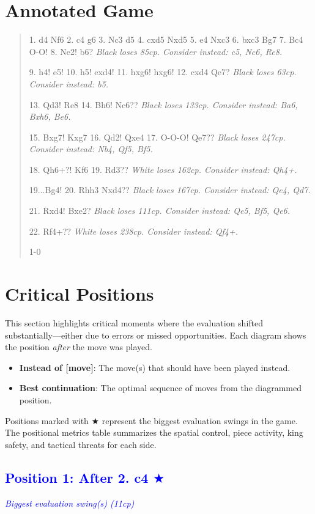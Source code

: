 \documentclass[11pt]{book}
\begin{document}
\section{Annotated Game}

\begin{quote}
1. d4 Nf6
2. c4 g6
3. Nc3 d5
4. cxd5 Nxd5
5. e4 Nxc3
6. bxc3 Bg7
7. Bc4 O-O!
8. Ne2! b6?
\textit{Black loses 85cp. Consider instead: c5, Nc6, Re8.}

9. h4! e5!
10. h5! exd4!
11. hxg6! hxg6!
12. cxd4 Qe7?
\textit{Black loses 63cp. Consider instead: b5.}

13. Qd3! Re8
14. Bh6! Nc6??
\textit{Black loses 133cp. Consider instead: Ba6, Bxh6, Be6.}

15. Bxg7! Kxg7
16. Qd2! Qxe4
17. O-O-O! Qe7??
\textit{Black loses 247cp. Consider instead: Nb4, Qf5, Bf5.}

18. Qh6+?! Kf6
19. Rd3??
\textit{White loses 162cp. Consider instead: Qh4+.}

19...Bg4!
20. Rhh3 Nxd4??
\textit{Black loses 167cp. Consider instead: Qe4, Qd7.}

21. Rxd4! Bxe2?
\textit{Black loses 111cp. Consider instead: Qe5, Bf5, Qe6.}

22. Rf4+??
\textit{White loses 238cp. Consider instead: Qf4+.}


1-0
\end{quote}

\section{Critical Positions}

This section highlights critical moments where the evaluation shifted substantially---either due to errors or missed opportunities. Each diagram shows the position \emph{after} the move was played.

\begin{itemize}
\item \textbf{Instead of [move]}: The move(s) that should have been played instead.
\item \textbf{Best continuation}: The optimal sequence of moves from the diagrammed position.
\end{itemize}

Positions marked with {\color{blue}$\bigstar$} represent the biggest evaluation swings in the game. The positional metrics table summarizes the spatial control, piece activity, king safety, and tactical threats for each side.

\subsection*{\textcolor{blue}{Position 1: After 2. c4 $\bigstar$}}
\textit{\textcolor{blue}{Biggest evaluation swing(s) (11cp)}}
\end{document}
